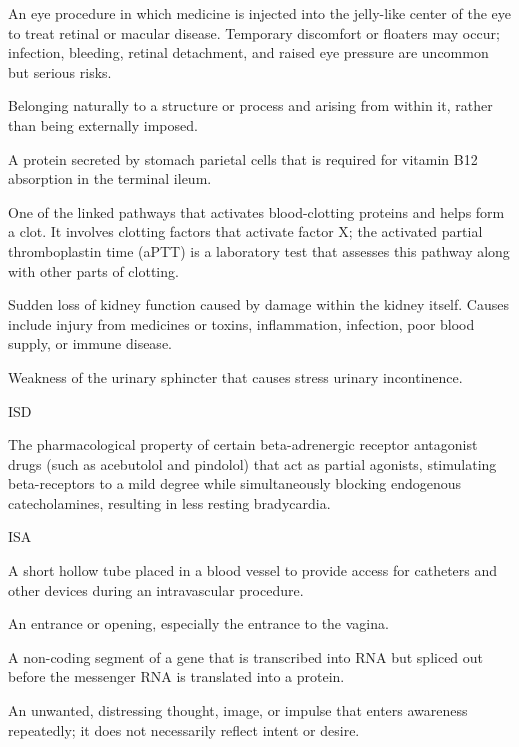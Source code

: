  An eye procedure in which medicine is injected into the jelly-like center of the eye to treat retinal or macular disease. Temporary discomfort or floaters may occur; infection, bleeding, retinal detachment, and raised eye pressure are uncommon but serious risks.

 Belonging naturally to a structure or process and arising from within it, rather than being externally imposed.

 A protein secreted by stomach parietal cells that is required for vitamin B12 absorption in the terminal ileum.

 One of the linked pathways that activates blood-clotting proteins and helps form a clot. It involves clotting factors that activate factor X; the activated partial thromboplastin time (aPTT) is a laboratory test that assesses this pathway along with other parts of clotting.

 Sudden loss of kidney function caused by damage within the kidney itself. Causes include injury from medicines or toxins, inflammation, infection, poor blood supply, or immune disease.

 Weakness of the urinary sphincter that causes stress urinary incontinence.

\synonyms
ISD

 The pharmacological property of certain beta-adrenergic receptor antagonist drugs (such as acebutolol and pindolol) that act as partial agonists, stimulating beta-receptors to a mild degree while simultaneously blocking endogenous catecholamines, resulting in less resting bradycardia.

\synonyms
ISA

 A short hollow tube placed in a blood vessel to provide access for catheters and other devices during an intravascular procedure.

 An entrance or opening, especially the entrance to the vagina.

 A non-coding segment of a gene that is transcribed into RNA but spliced out before the
messenger RNA is translated into a protein.

 An unwanted, distressing thought, image, or impulse that enters awareness repeatedly; it does not necessarily reflect intent or desire.

